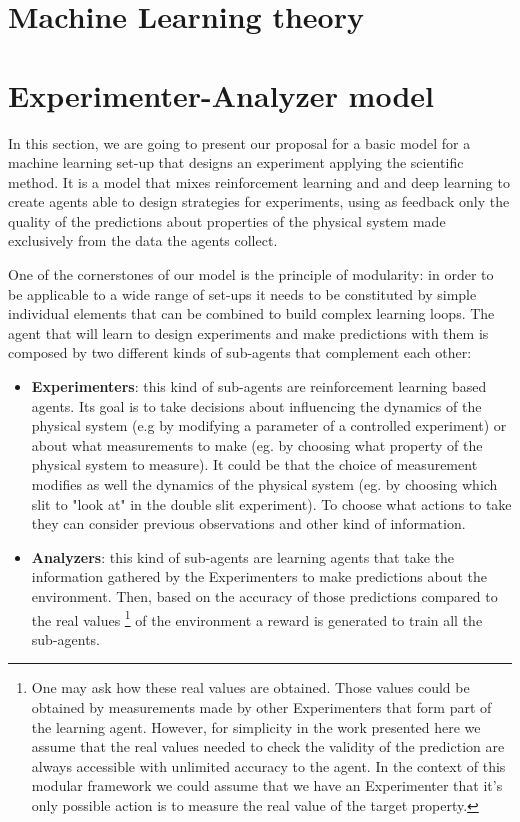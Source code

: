 \documentclass[11pt,a4paper,twoside]{report}
\newcommand{\+}{\textnormal{+} }
\theoremstyle{definition}
\numberwithin{equation}{chapter}
\begin{document}
\chapter{Machine Learning theory} 

\chapter{Experimenter-Analyzer model}

In this section, we are going to present our proposal for a basic model for a
machine learning set-up that designs an experiment applying the scientific
method. It is a model that mixes reinforcement learning and and deep learning to
create agents able to design strategies for experiments, using as feedback only
the quality of the predictions about properties of the physical system made
exclusively from the data the agents collect. 

One of the cornerstones of our model is the principle of modularity: in order to
be applicable to a wide range of set-ups it needs to be constituted by simple
individual elements that can be combined to build complex learning loops. The
agent that will learn to design experiments and make predictions with them is
composed by two different kinds of sub-agents that complement each other:

\begin{itemize}
  \item \textbf{Experimenters}: this kind of sub-agents are reinforcement
  learning based agents. Its goal is to take decisions about influencing the
  dynamics of the physical system (e.g by modifying a parameter of a controlled
  experiment) or about what measurements to make (eg. by choosing what property
  of the physical system to measure). It could be that the choice of
  measurement modifies as well the dynamics of the physical system (eg. by
  choosing which slit to "look at" in the double slit experiment). To choose
  what actions to take they can consider previous observations and other kind of 
  information.
  \item \textbf{Analyzers}: this kind of sub-agents are learning agents
  that take the information gathered by the Experimenters to make predictions
  about the environment. Then, based on the accuracy of those predictions
  compared to the real values \footnote{One may ask how these real values are
  obtained. Those values could be obtained by measurements made by other
  Experimenters that form part of the learning agent. However, for simplicity in
  the work presented here we assume that the real values needed to check the
  validity of the prediction are always accessible with unlimited accuracy to
  the agent. In the context of this modular framework we could assume that we
  have an Experimenter that it's only possible action is to measure the real
  value of the target property.} of the environment a reward is generated to
  train all the sub-agents. 

\end{itemize}
\end{document}
